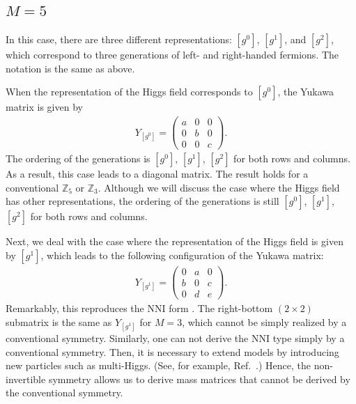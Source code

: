 \documentclass[a4paper,11pt]{article}
\numberwithin{equation}{section}
\begin{document}
\subsection{$M=5$}



In this case, there are three different representations: $[g^0]$, $[g^1]$, and $[g^2]$, which correspond to three generations of left- and right-handed fermions. 
The notation is the same as above.


When the representation of the Higgs field corresponds to $[g^0]$, the Yukawa matrix is given by
\begin{align}
Y_{[g^0]}=
\begin{pmatrix}
a & 0 & 0\\
0 & b & 0 \\
0 & 0& c
\label{M5-0}
\end{pmatrix}
.
\end{align}
The ordering of the generations is $[g^0]$, $[g^1]$, $[g^2]$ for both rows and columns. 
As a result, this case leads to a diagonal matrix.
The result holds for a conventional $\mathbb{Z}_5$ or $\mathbb{Z}_3$. 
Although we will discuss the case where the Higgs field has other representations,
the ordering of the generations is still $[g^0]$, $[g^1]$, $[g^2]$ for both rows and columns.

Next, we deal with the case where the representation of the Higgs field is given by $[g^1]$, which leads to the following configuration of the Yukawa matrix:
\begin{align}
Y_{[g^1]}=
\begin{pmatrix}
0 & a & 0\\
b & 0 & c \\
0 & d & e
\label{M5-1}
\end{pmatrix}
.
\end{align}
Remarkably, this reproduces the NNI form \cite{Branco:1988iq,Branco:1994jx,Branco:1999nb}.  
The right-bottom $(2 \times 2)$ submatrix is the same as $Y_{[g^1]}$ for $M=3$, 
which cannot be simply realized by a 
conventional symmetry.
Similarly, one can not derive the NNI type 
simply by a conventional symmetry.
Then, it is necessary to extend models by introducing new particles such as multi-Higgs. 
(See, for example, Ref.~\cite{Kikuchi:2022svo}.)
Hence, the non-invertible symmetry allows us to derive mass matrices that cannot be derived by the conventional symmetry.
\end{document}
